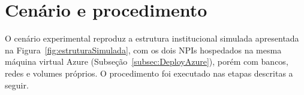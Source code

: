 \section{Cenário e procedimento}\label{sec:resultadosSincCenario}

O cenário experimental reproduz a estrutura institucional simulada
apresentada na Figura~\ref{fig:estruturaSimulada}, com os dois NPIs
hospedados na mesma máquina virtual Azure
(Subseção~\ref{subsec:DeployAzure}), porém com bancos, redes e
volumes próprios. O procedimento foi executado nas etapas descritas
a seguir.

